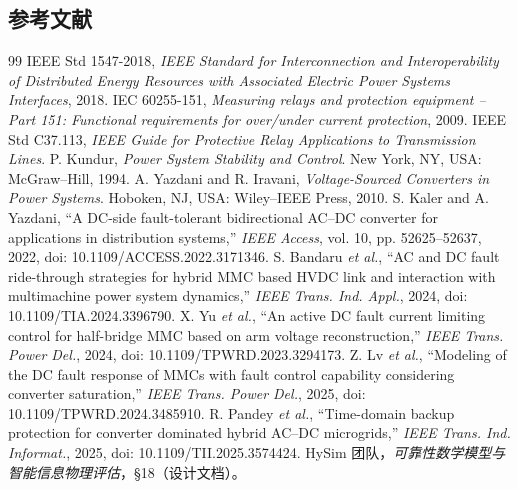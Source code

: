 \subsection{参考文献}
\begin{thebibliography}{99}
 IEEE Std 1547-2018, \emph{IEEE Standard for Interconnection and Interoperability
 of Distributed Energy Resources with Associated Electric Power Systems Interfaces}, 2018.
 IEC 60255-151, \emph{Measuring relays and protection equipment -- Part 151:
 Functional requirements for over/under current protection}, 2009.
 IEEE Std C37.113, \emph{IEEE Guide for Protective Relay Applications to Transmission Lines}.
 P. Kundur, \emph{Power System Stability and Control}. New York, NY, USA:
 McGraw--Hill, 1994.
 A. Yazdani and R. Iravani, \emph{Voltage-Sourced Converters in Power Systems}.
 Hoboken, NJ, USA: Wiley--IEEE Press, 2010.
 S. Kaler and A. Yazdani, ``A DC-side fault-tolerant
 bidirectional AC--DC converter for applications in distribution systems,''
 \emph{IEEE Access}, vol. 10, pp. 52625--52637, 2022,
 doi: 10.1109/ACCESS.2022.3171346.
 S. Bandaru \emph{et al.}, ``AC and DC fault
 ride-through strategies for hybrid MMC based HVDC link and interaction with
 multimachine power system dynamics,'' \emph{IEEE Trans. Ind. Appl.}, 2024,
 doi: 10.1109/TIA.2024.3396790.
 X. Yu \emph{et al.}, ``An active DC fault current
 limiting control for half-bridge MMC based on arm voltage reconstruction,''
 \emph{IEEE Trans. Power Del.}, 2024, doi: 10.1109/TPWRD.2023.3294173.
 Z. Lv \emph{et al.}, ``Modeling of the DC fault response
 of MMCs with fault control capability considering converter saturation,''
 \emph{IEEE Trans. Power Del.}, 2025, doi: 10.1109/TPWRD.2024.3485910.
 R. Pandey \emph{et al.}, ``Time-domain backup
 protection for converter dominated hybrid AC--DC microgrids,''
 \emph{IEEE Trans. Ind. Informat.}, 2025, doi: 10.1109/TII.2025.3574424.
 HySim 团队，\emph{可靠性数学模型与智能信息物理评估}，\S18（设计文档）。
\end{thebibliography}
